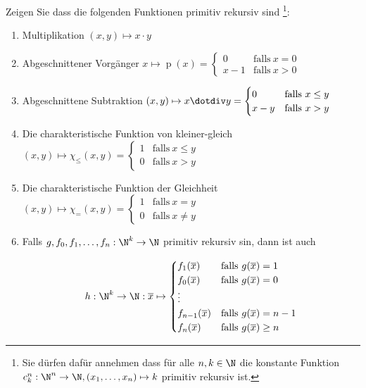 
\begin{exercise}

Zeigen Sie dass die folgenden Funktionen primitiv rekursiv sind \footnote{Sie dürfen dafür annehmen dass für alle $n, k \in \N$ die konstante Funktion $c_k^n: \N^n \to \N, (x_1, \dots, x_n) \mapsto k$ primitiv rekursiv ist.}:

\begin{enumerate}[label = (\alph*)]

    \item Multiplikation $(x, y) \mapsto x \cdot y$

    \item Abgeschnittener Vorgänger $x \mapsto \operatorname p(x) = \begin{cases} 0 & \text{falls}~ x = 0 \\ x - 1 & \text{falls}~ x > 0 \end{cases}$

    \item Abgeschnittene Subtraktion $(x, y) \mapsto x \dotdiv y = \begin{cases} 0 & \text{falls}~ x \leq y \\ x - y & \text{falls}~ x > y \end{cases}$

    \item Die charakteristische Funktion von kleiner-gleich $(x, y) \mapsto \chi_\leq(x, y) = \begin{cases} 1 & \text{falls}~ x \leq y \\ 0 & \text{falls}~ x > y \end{cases}$

    \item Die charakteristische Funktion der Gleichheit $(x, y) \mapsto \chi_=(x, y) = \begin{cases} 1 & \text{falls}~ x = y \\ 0 & \text{falls}~ x \neq y \end{cases}$

    \item Falls $g, f_0, f_1, \dots, f_n: \N^k \to \N$ primitiv rekursiv sin, dann ist auch
    
    \begin{align*}
        h:
            \N^k \to \N:
            \overline x
            \mapsto
            \begin{cases}
                f_1(\overline x)     & \text{falls}~ g(\overline x) = 1     \\
                f_0(\overline x)     & \text{falls}~ g(\overline x) = 0     \\
                \vdots               &                                      \\
                f_{n-1}(\overline x) & \text{falls}~ g(\overline x) = {n-1} \\
                f_n(\overline x)     & \text{falls}~ g(\overline x) \geq n
            \end{cases}
    \end{align*}


\end{enumerate}
\end{exercise}

